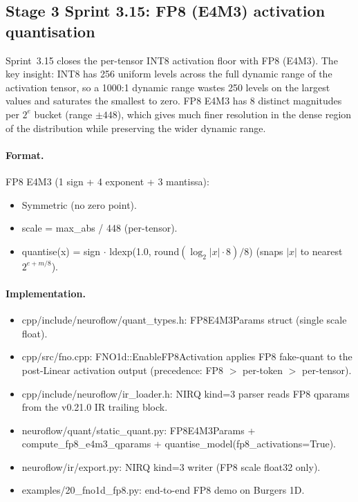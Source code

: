 \documentclass[10pt,twocolumn]{article}
\renewcommand{\texttt}[1]{{\normalfont\ttfamily #1}\normalfont\rmfamily}
\begin{document}
\subsection{Stage 3 Sprint 3.15: FP8 (E4M3) activation quantisation}
\label{sec:fp8}

Sprint~3.15 closes the per-tensor INT8 activation
floor with FP8 (E4M3).  The key insight: INT8 has
256 uniform levels across the full dynamic range
of the activation tensor, so a 1000:1 dynamic
range wastes 250 levels on the largest values and
saturates the smallest to zero.  FP8 E4M3 has
8 distinct magnitudes per $2^e$ bucket (range
$\pm 448$), which gives much finer resolution in
the dense region of the distribution while
preserving the wider dynamic range.

\paragraph{Format.}
FP8 E4M3 (1 sign + 4 exponent + 3 mantissa):
\begin{itemize}
\item Symmetric (no zero point).
\item \texttt{scale = max\_abs / 448} (per-tensor).
\item \texttt{quantise(x) = sign $\cdot$ ldexp(1.0,
round$(\log_2|x| \cdot 8)/8$)} (snaps $|x|$ to
nearest $2^{e + m/8}$).
\end{itemize}

\paragraph{Implementation.}
\begin{itemize}
\item \texttt{cpp/include/neuroflow/quant\_types.h}:
\texttt{FP8E4M3Params} struct (single \texttt{scale}
float).
\item \texttt{cpp/src/fno.cpp}:
\texttt{FNO1d::EnableFP8Activation} applies FP8
fake-quant to the post-\texttt{Linear} activation
output (precedence: FP8 $>$ per-token $>$ per-tensor).
\item \texttt{cpp/include/neuroflow/ir\_loader.h}:
NIRQ \texttt{kind=3} parser reads FP8 qparams
from the v0.21.0 IR trailing block.
\item \texttt{neuroflow/quant/static\_quant.py}:
\texttt{FP8E4M3Params} + \texttt{compute\_fp8\_e4m3\_qparams}
+ \texttt{quantise\_model(fp8\_activations=True)}.
\item \texttt{neuroflow/ir/export.py}: NIRQ
\texttt{kind=3} writer (FP8 scale float32 only).
\item \texttt{examples/20\_fno1d\_fp8.py}: end-to-end
FP8 demo on Burgers 1D.
\end{itemize}
\end{document}
